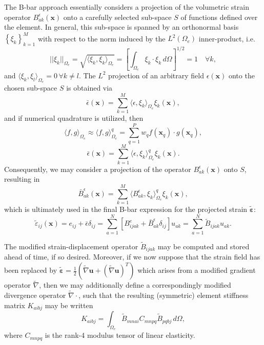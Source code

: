 The B-bar approach essentially considers a projection of the volumetric strain operator $B^\epsilon_{ak} (\mathbf{x})$ onto a carefully selected sub-space $S$ of functions defined over the element. In general, this sub-space is spanned by an orthonormal basis $\left\{ \xi_k \right\}_{k = 1}^{M}$ with respect to the norm induced by the $L^2 (\Omega_e)$ inner-product, i.e.
\begin{equation}
  || \xi_k ||_{\Omega_e} = \sqrt{\langle \xi_k, \xi_k \rangle_{\Omega_e}} = \left[ \int_{\Omega_e} \xi_k \cdot \xi_k \, d \Omega \right]^{1/2} = 1 \quad \forall k,
\end{equation}
and $\langle \xi_k, \xi_l \rangle_{\Omega_e} = 0 \, \forall k \neq l$. The $L^2$ projection of an arbitrary field $\epsilon (\mathbf{x})$ onto the chosen sub-space $S$ is obtained via
\begin{equation}
  \bar{\epsilon} (\mathbf{x}) = \sum_{k=1}^{M} \langle \epsilon, \xi_k \rangle_{\Omega_e} \xi_k (\mathbf{x}),
\end{equation}
and if numerical quadrature is utilized, then
\begin{equation}
  \langle f, g \rangle_{\Omega_e} \approx \langle f, g \rangle^q_{\Omega_e} = \sum_{q=1}^{P} w_q f (\mathbf{x}_q) \cdot g (\mathbf{x}_q),
\end{equation}
\begin{equation}
  \bar{\epsilon} (\mathbf{x}) = \sum_{k=1}^{M} \langle \epsilon, \xi_k \rangle^q_{\Omega_e} \xi_k (\mathbf{x}).
\end{equation}
Consequently, we may consider a projection of the operator $B^\epsilon_{ak} (\mathbf{x})$ onto $S$, resulting in
\begin{equation}
  \bar{B}^\epsilon_{ak} (\mathbf{x}) = \sum_{k=1}^{M} \langle B^\epsilon_{ak}, \xi_k \rangle^q_{\Omega_e} \xi_k (\mathbf{x}),
\end{equation}
which is ultimately used in the final B-bar expression for the projected strain $\tilde{\boldsymbol{\varepsilon}}$:
\begin{equation}
  \tilde{\varepsilon}_{ij} (\mathbf{x}) = e_{ij} + \bar{\epsilon} \delta_{ij} = \sum_{a = 1}^N \left[ B^e_{ijak} + \bar{B}^\epsilon_{ak} \delta_{ij} \right] u_{ak} = \sum_{a = 1}^N \tilde{B}_{ijak} u_{ak}.
\end{equation}

The modified strain-displacement operator $\tilde{B}_{ijak}$ may be computed and stored ahead of time, if so desired. Moreover, if we now suppose that the strain field has been replaced by $\tilde{\boldsymbol{\varepsilon}} = \frac{1}{2} (\tilde{\nabla} \mathbf{u} + (\tilde{\nabla} \mathbf{u})^T)$ which arises from a modified gradient operator $\tilde{\nabla}$, then we may additionally define a correspondingly modified divergence operator $\tilde{\nabla} \cdot$, such that the resulting (symmetric) element stiffness matrix $K_{aibj}$ may be written
\begin{equation}
  K_{aibj} = \int_{\Omega_e} \tilde{B}_{mnai} C_{mnpq} \tilde{B}_{pqbj} \, d \Omega,
\end{equation}
where $C_{mnpq}$ is the rank-4 modulus tensor of linear elasticity.

